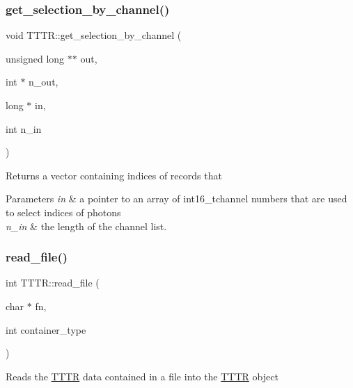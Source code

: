 \mbox{\label{class_t_t_t_r_a9c96c502be774e60f4bcc3442c7a5011}} 
\subsubsection{\texorpdfstring{get\+\_\+selection\+\_\+by\+\_\+channel()}{get\_selection\_by\_channel()}}
{\footnotesize\ttfamily void T\+T\+T\+R\+::get\+\_\+selection\+\_\+by\+\_\+channel (\begin{DoxyParamCaption}\item[{unsigned long $\ast$$\ast$}]{out,  }\item[{int $\ast$}]{n\+\_\+out,  }\item[{long $\ast$}]{in,  }\item[{int}]{n\+\_\+in }\end{DoxyParamCaption})}

Returns a vector containing indices of records that 
\begin{DoxyParams}{Parameters}
{\em in} & a pointer to an array of int16\+\_\+tchannel numbers that are used to select indices of photons \\
\hline
{\em n\+\_\+in} & the length of the channel list. \\
\hline
\end{DoxyParams}
\mbox{\label{class_t_t_t_r_a499f299893269806ef42cca2227fd75b}} 
\subsubsection{\texorpdfstring{read\+\_\+file()}{read\_file()}\hspace{0.1cm}{\footnotesize\ttfamily [1/2]}}
{\footnotesize\ttfamily int T\+T\+T\+R\+::read\+\_\+file (\begin{DoxyParamCaption}\item[{char $\ast$}]{fn,  }\item[{int}]{container\+\_\+type }\end{DoxyParamCaption})}

Reads the \hyperlink{class_t_t_t_r}{T\+T\+TR} data contained in a file into the \hyperlink{class_t_t_t_r}{T\+T\+TR} object


